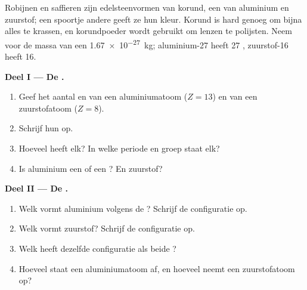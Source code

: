 \begin{problem}
\label{pb:g10:electron-shells:1}
Robijnen en saffieren zijn edelsteenvormen van korund, een 
van aluminium en zuurstof; een spoortje andere  geeft ze hun
kleur. Korund is hard genoeg om bijna alles te krassen, en korundpoeder
wordt gebruikt om lenzen te polijsten. Neem voor de massa van een 
\qty{1.67e-27}{kg}; aluminium-27 heeft 27 , zuurstof-16 heeft 16.

\medskip
\noindent\textbf{Deel I --- De .}
\begin{enumerate}
  \item Geef het aantal  en  van een aluminiumatoom
        ($Z = 13$) en van een zuurstofatoom ($Z = 8$).
  \item Schrijf hun  op.
  \item Hoeveel  heeft elk? In welke periode en groep
        staat elk?
  \item Is aluminium een  of een ? En zuurstof?
\end{enumerate}

\medskip
\noindent\textbf{Deel II --- De .}
\begin{enumerate}[resume]
  \item Welk  vormt aluminium volgens de ? Schrijf de
        configuratie op.
  \item Welk  vormt zuurstof? Schrijf de configuratie op.
  \item Welk  heeft dezelfde configuratie als beide ?
  \item Hoeveel  staat een aluminiumatoom af, en hoeveel neemt
        een zuurstofatoom op?
\end{enumerate}


\end{problem}
